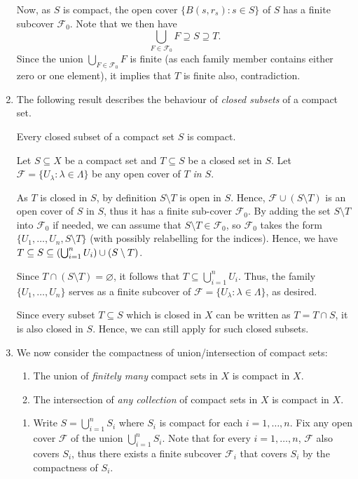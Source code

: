 \begin{enumerate}
\begin{pf}
Now, as \(S\) is compact, the open cover \(\{B(s,r_s):s\in S\}\) of \(S\) has a
finite subcover \(\mathcal{F}_0\). Note that we then have
\[
\bigcup_{F\in\mathcal{F}_0}F\supseteq S\supseteq T.
\]
Since the union \(\bigcup_{F\in\mathcal{F}_0}F\) is finite (as
each family member contains either zero or one element), it implies that \(T\)
is finite also, contradiction.
\end{pf}
\item The following result describes the behaviour of \emph{closed subsets} of
a compact set.
\begin{theorem}
\label{thm:subset-closed-in-cpt-is-cpt}
Every closed subset of a compact set \(S\) is compact.
\end{theorem}
\begin{pf}
Let \(S\subseteq X\) be a compact set and \(T\subseteq S\) be a closed set in
\(S\). Let \(\mathcal{F}=\{U_{\lambda}:\lambda\in\Lambda\}\) be any open cover
of \(T\) \emph{in \(S\)}.

As \(T\) is closed in \(S\), by definition \(S\setminus T\) is open in \(S\).
Hence, \(\mathcal{F}\cup(S\setminus T)\) is an open cover of \(S\) in \(S\),
thus it has a finite sub-cover \(\mathcal{F}_0\). By adding the set
\(S\setminus T\) into \(\mathcal{F}_0\) if needed, we can assume that
\(S\setminus T\in\mathcal{F}_0\), so \(\mathcal{F}_0\) takes the form
\(\{U_1,\dotsc,U_n,S\setminus T\}\) (with possibly relabelling for the
indices). Hence, we have \(T\subseteq S\subseteq \qty(\bigcup_{i=1}^{n}U_i)\cup
(S\setminus T)\).

Since \(T\cap (S\setminus T)=\varnothing\), it follows that \(T\subseteq
\bigcup_{i=1}^{n}U_i.\) Thus, the family \(\{U_1,\dotsc,U_n\}\) serves as a
finite subcover of \(\mathcal{F}=\{U_{\lambda}:\lambda\in\Lambda\}\), as
desired.
\end{pf}

\begin{note}
Since every subset \(T\subseteq S\) which is closed in \(X\) can be written as
\(T=T\cap S\), it is also closed in \(S\). Hence, we can still apply
 for such closed subsets.
\end{note}
\item We now consider the compactness of union/intersection of compact sets:
\begin{enumerate}
\item \label{it:cpt-union-cpt} The union of \emph{finitely many} compact sets in \(X\) is compact in
\(X\).
\item \label{it:cpt-intersect-cpt} The intersection of \emph{any collection} of compact sets in \(X\) is
compact in \(X\).
\end{enumerate}
\begin{pf}
\begin{enumerate}
\item Write \(S=\bigcup_{i=1}^{n}S_i\) where \(S_i\) is compact
for each \(i=1,\dotsc,n\).  Fix any open cover \(\mathcal{F}\) of the union
\(\bigcup_{i=1}^{n}S_i\). Note that for every \(i=1,\dotsc,n\), \(\mathcal{F}\)
also covers \(S_i\), thus there exists a finite subcover \(\mathcal{F}_i\)
that covers \(S_i\) by the compactness of \(S_i\).


\end{enumerate}
\end{pf}
\end{enumerate}

